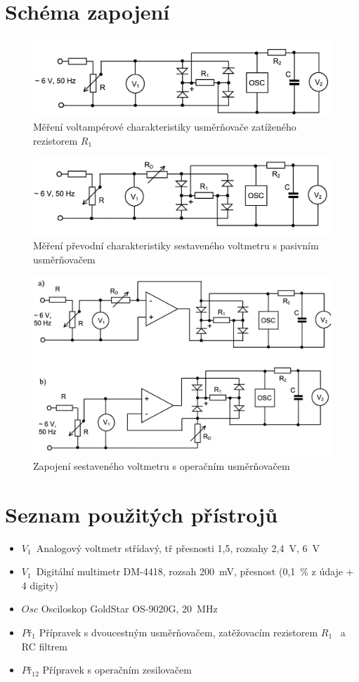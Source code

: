 \documentclass[a4paper,12pt]{article}   %
\newcommand{\ri}{$R_1$}
\newcommand{\vi}{$V_1$}
\newcommand{\vii}{$V_1$}
\begin{document}
\section{Schéma zapojení}
\label{schema_zapojeni}
\begin{figure}[h!]
    \centering
    \includegraphics[width=.8\textwidth]{va_char.png}
    \caption{Měření voltampérové charakteristiky usměrňovače zatíženého rezistorem \ri}
    \label{fig:va}
\end{figure}
\begin{figure}[h!]
    \centering
    \includegraphics[width=.8\textwidth]{prevod_char.png}
    \caption{Měření převodní charakteristiky sestaveného voltmetru s pasivním usměrňovačem}
    \label{va:prevod}
\end{figure}
\begin{figure}[h!]
    \centering
    \includegraphics[width=.8\textwidth]{voltmetr.png}
    \caption{Zapojení sestaveného voltmetru s operačním usměrňovačem}
    \label{fig:op}
\end{figure}

\section{Seznam použitých přístrojů}
\begin{itemize}
    \item \vi~Analogový voltmetr střídavý, tř přesnosti 1,5, rozsahy 2,4~V, 6~V
    \item \vii~Digitální multimetr DM-4418, rozsah 200~mV, přesnost (0,1~\% z údaje + 4 digity)\
    \item $Osc$ Osciloskop GoldStar OS-9020G, 20~MHz
    \item $Př_1$ Přípravek s dvoucestným usměrňovačem, zatěžovacím rezistorem \ri~ a RC filtrem
    \item $Př_12$ Přípravek s operačním zesilovačem
\end{itemize}
\end{document}
